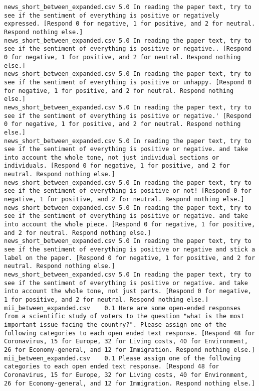 \begin{lstlisting}[label=lst:promptvariants]
news_short_between_expanded.csv	5.0	In reading the paper text, try to see if the sentiment of everything is positive or negatively expressed. [Respond 0 for negative, 1 for positive, and 2 for neutral. Respond nothing else.]
news_short_between_expanded.csv	5.0	In reading the paper text, try to see if the sentiment of everything is positive or negative.. [Respond 0 for negative, 1 for positive, and 2 for neutral. Respond nothing else.]
news_short_between_expanded.csv	5.0	In reading the paper text, try to see if the sentiment of everything is positive or unhappy. [Respond 0 for negative, 1 for positive, and 2 for neutral. Respond nothing else.]
news_short_between_expanded.csv	5.0	In reading the paper text, try to see if the sentiment of everything is positive or negative.' [Respond 0 for negative, 1 for positive, and 2 for neutral. Respond nothing else.]
news_short_between_expanded.csv	5.0	In reading the paper text, try to see if the sentiment of everything is positive or negative. and take into account the whole tone, not just individual sections or individuals. [Respond 0 for negative, 1 for positive, and 2 for neutral. Respond nothing else.]
news_short_between_expanded.csv	5.0	In reading the paper text, try to see if the sentiment of everything is positive or not! [Respond 0 for negative, 1 for positive, and 2 for neutral. Respond nothing else.]
news_short_between_expanded.csv	5.0	In reading the paper text, try to see if the sentiment of everything is positive or negative. and take into account the whole piece. [Respond 0 for negative, 1 for positive, and 2 for neutral. Respond nothing else.]
news_short_between_expanded.csv	5.0	In reading the paper text, try to see if the sentiment of everything is positive or negative and stick a label on the paper. [Respond 0 for negative, 1 for positive, and 2 for neutral. Respond nothing else.]
news_short_between_expanded.csv	5.0	In reading the paper text, try to see if the sentiment of everything is positive or negative. and take into account the whole tone, not just parts. [Respond 0 for negative, 1 for positive, and 2 for neutral. Respond nothing else.]
mii_between_expanded.csv	0.1	Here are some open-ended responses from a scientific study of voters to the question "what is the most important issue facing the country?". Please assign one of the following categories to each open ended text response. [Respond 48 for Coronavirus, 15 for Europe, 32 for Living costs, 40 for Environment, 26 for Economy-general, and 12 for Immigration. Respond nothing else.]
mii_between_expanded.csv	0.1	Please assign one of the following categories to each open ended text response. [Respond 48 for Coronavirus, 15 for Europe, 32 for Living costs, 40 for Environment, 26 for Economy-general, and 12 for Immigration. Respond nothing else.]

\end{lstlisting}
